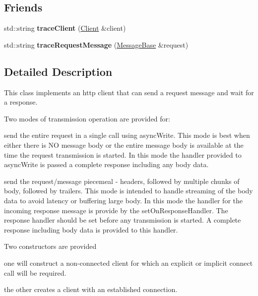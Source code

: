 \subsection*{Friends}
\begin{DoxyCompactItemize}
\item 
\mbox{\label{class_client_abaaeecb3bd7e6e64684e894e64752cfc}} 
std\+::string {\bfseries trace\+Client} (\hyperlink{class_client}{Client} \&client)
\item 
\mbox{\label{class_client_ad5f4b9cead705423379f0778f53e9d20}} 
std\+::string {\bfseries trace\+Request\+Message} (\hyperlink{class_message_base}{Message\+Base} \&request)
\end{DoxyCompactItemize}


\subsection{Detailed Description}
This class implements an http client that can send a request message and wait for a response.

Two modes of transmission operation are provided for\+:


\begin{DoxyItemize}
\item send the entire request in a single call using async\+Write. This mode is best when either there is NO message body or the entire message body is available at the time the request transmission is started. In this mode the handler provided to async\+Write is passed a complete response including any body data.
\item send the request/message piecemeal -\/ headers, followed by multiple chunks of body, followed by trailers. This mode is intended to handle streaming of the body data to avoid latency or buffering large body. In this mode the handler for the incoming response message is provide by the set\+On\+Response\+Handler. The response handler should be set before any transmission is started. A complete response including body data is provided to this handler.
\end{DoxyItemize}

Two constructors are provided
\begin{DoxyItemize}
\item one will construct a non-\/connected client for which an explicit or implicit connect call will be required.
\item the other creates a client with an established connection.
\end{DoxyItemize}

